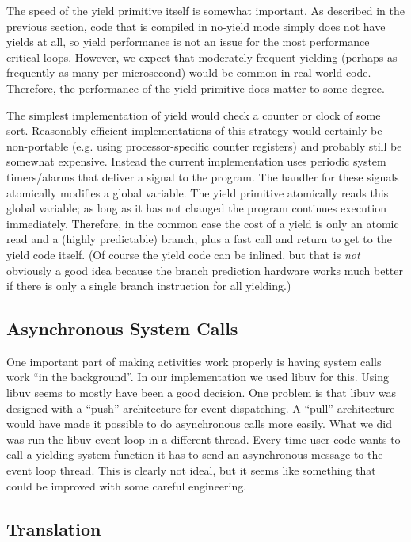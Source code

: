 \documentclass[pldi,10pt,preprint]{sigplanconf-pldi16}
\begin{document}
The speed of the yield primitive itself is somewhat important.
As described in the previous section, code that is compiled in no-yield mode simply does not have yields at all, so yield performance is not an issue for the most performance critical loops.
However, we expect that moderately frequent yielding (perhaps as frequently as many per microsecond) would be common in real-world code.
Therefore, the performance of the yield primitive does matter to some degree.

The simplest implementation of yield would check a counter or clock of some sort.
Reasonably efficient implementations of this strategy would certainly be non-portable (e.g. using processor-specific counter registers) and probably still be somewhat expensive.
Instead the current \charcoal{} implementation uses periodic system timers/alarms that deliver a signal to the program.
The handler for these signals atomically modifies a global variable.
The yield primitive atomically reads this global variable; as long as it has not changed the program continues execution immediately.
Therefore, in the common case the cost of a yield is only an atomic read and a (highly predictable) branch, plus a fast call and return to get to the yield code itself.
(Of course the yield code can be inlined, but that is \emph{not} obviously a good idea because the branch prediction hardware works much better if there is only a single branch instruction for all yielding.)

\subsection{Asynchronous System Calls}

One important part of making activities work properly is having system calls work ``in the background''.
In our implementation we used libuv for this.
Using libuv seems to mostly have been a good decision.
One problem is that libuv was designed with a ``push'' architecture for event dispatching.
A ``pull'' architecture would have made it possible to do asynchronous calls more easily.
What we did was run the libuv event loop in a different thread.
Every time user code wants to call a yielding system function it has to send an asynchronous message to the event loop thread.
This is clearly not ideal, but it seems like something that could be improved with some careful engineering.

\subsection{Translation}
\end{document}
